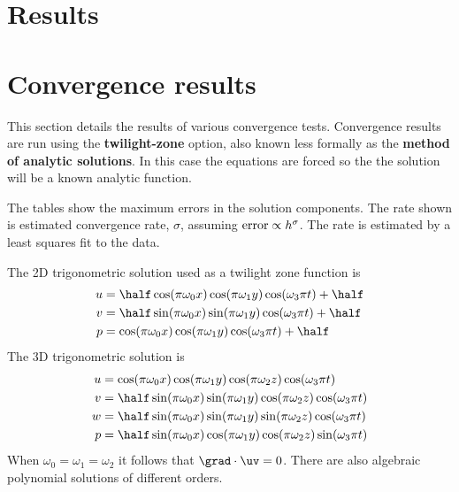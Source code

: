 \section{Results} \label{sec:results}

\section{Convergence results}

This section details the results of various convergence tests. 
Convergence results are run using the {\bf twilight-zone} option, also
known less formally as the {\bf method of analytic solutions}.
In this case the equations are forced so the the solution will
be a known analytic function.

The tables show the maximum errors in the solution components. The rate shown is estimated convergence rate, $\sigma$,
assuming ${\rm error} \propto h^\sigma$. The rate is estimated by a least squares fit to the data.

The 2D trigonometric solution used as a twilight zone function is
\begin{align*}
    u &= \half \cos(\pi \omega_0 x) \cos(\pi \omega_1 y) \cos( \omega_3 \pi t) + \half\\
    v &= \half \sin(\pi \omega_0 x) \sin(\pi \omega_1 y) \cos( \omega_3 \pi t) + \half\\
    p &=       \cos(\pi \omega_0 x) \cos(\pi \omega_1 y) \cos( \omega_3 \pi t)  + \half
\end{align*}
The 3D trigonometric solution is
\begin{align*}
    u &=       \cos(\pi \omega_0 x) \cos(\pi \omega_1 y) \cos(\pi \omega_2 z) \cos( \omega_3 \pi t) \\
    v &= \half \sin(\pi \omega_0 x) \sin(\pi \omega_1 y) \cos(\pi \omega_2 z) \cos( \omega_3 \pi t) \\
    w &= \half \sin(\pi \omega_0 x) \sin(\pi \omega_1 y) \sin(\pi \omega_2 z) \cos( \omega_3 \pi t) \\
    p &= \half \sin(\pi \omega_0 x) \cos(\pi \omega_1 y) \cos(\pi \omega_2 z) \sin( \omega_3 \pi t) 
\end{align*}
When $\omega_0=\omega_1=\omega_2$ it follows that $\grad\cdot\uv=0$.
There are also algebraic polynomial solutions of different orders.


